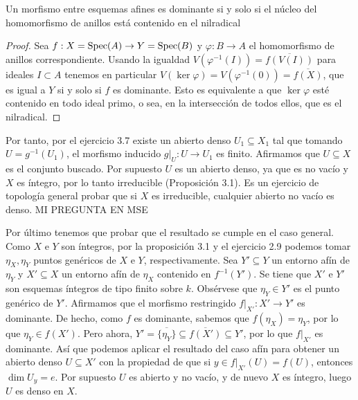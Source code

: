 \documentclass[twoside]{article}
\begin{document}
\begin{solucion}
\begin{enumerate}[(a)]
\begin{lemma}\label{lema1}
Un morfismo entre esquemas afines es dominante si y solo si el núcleo del homomorfismo de anillos está contenido en el nilradical
\end{lemma}
\begin{proof}
Sea $f:X=\operatorname{Spec}(A)\to Y=\operatorname{Spec}(B)$ y $\varphi:B\to A$ el homomorfismo de anillos correspondiente. Usando la igualdad $V(\varphi^{-1}(I))=\overline{f(V(I))}$ para ideales $I\subset A$ tenemos en particular $V(\ker\varphi)=V(\varphi^{-1}(0))=\overline{f(X)}$, que es igual a $Y$ si y solo si $f$ es dominante. Esto es equivalente a que $\ker\varphi$ esté contenido en todo ideal primo, o sea, en la intersección de todos ellos, que es el nilradical. 
\end{proof}

Por tanto, por el ejercicio 3.7 existe un abierto denso $U_1\subseteq X_1$ tal que tomando $U=g^{-1}(U_1)$, el morfismo inducido $g|_U:U\to U_1$ es finito. Afirmamos que $U\subseteq X$ es el conjunto buscado. Por supuesto $U$ es un abierto denso, ya que es no vacío y $X$ es íntegro, por lo tanto irreducible (Proposición 3.1). Es un ejercicio de topología general probar que si $X$ es irreducible, cualquier abierto no vacío es denso. MI PREGUNTA EN MSE

Por último tenemos que probar que el resultado se cumple en el caso general. Como $X$ e $Y$ son íntegros, por la proposición 3.1 y el ejercicio 2.9 podemos tomar $\eta_X,\eta_Y$ puntos genéricos de $X$ e $Y$, respectivamente. Sea $Y'\subseteq Y$ un entorno afín de $\eta_Y$ y $X'\subseteq X$ un entorno afín de $\eta_X$ contenido en $f^{-1}(Y')$. Se tiene que $X'$ e $Y'$ son esquemas íntegros de tipo finito sobre $k$. Obsérvese que $\eta_Y\in Y'$ es el punto genérico de $Y'$. Afirmamos que el morfismo restringido $f|_{X'}:X'\to Y'$ es dominante. De hecho, como $f$ es dominante, sabemos que $f(\eta_X)=\eta_Y$, por lo que $\eta_Y\in f(X')$. Pero ahora, $Y'=\overline{\{\eta_Y\}}\subseteq \overline{f(X')}\subseteq Y'$, por lo que $f|_{X'}$ es dominante. Así que podemos aplicar el resultado del caso afín para obtener un abierto denso $U\subseteq X'$ con la propiedad de que si $y\in f|_{X'}(U)=f(U)$, entonces $\dim U_y=e$. Por supuesto $U$ es abierto y no vacío, y de nuevo $X$ es íntegro, luego $U$ es denso en $X$. 


\end{enumerate}
\end{solucion}
\end{document}
